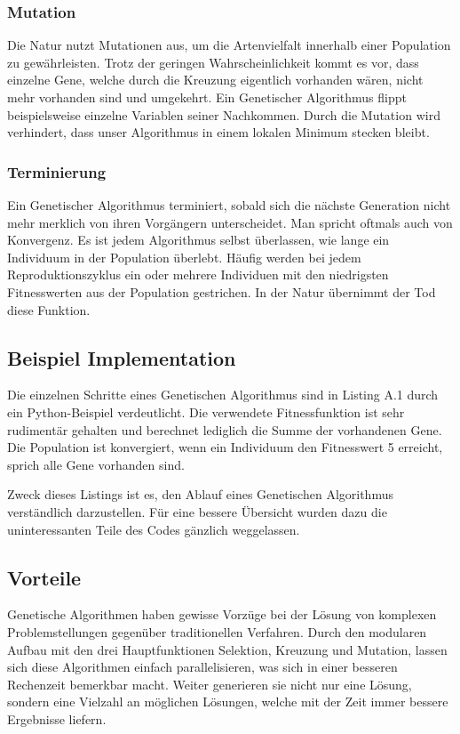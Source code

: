 \subsubsection{Mutation}
Die Natur nutzt Mutationen aus, um die Artenvielfalt innerhalb einer Population zu gewährleisten.
Trotz der geringen Wahrscheinlichkeit kommt es vor, dass einzelne Gene, welche durch die Kreuzung
eigentlich vorhanden wären, nicht mehr vorhanden sind und umgekehrt. Ein Genetischer Algorithmus
flippt beispielsweise einzelne Variablen seiner Nachkommen. Durch die Mutation wird verhindert,
dass unser Algorithmus in einem lokalen Minimum stecken bleibt.

\subsubsection{Terminierung}
Ein Genetischer Algorithmus terminiert, sobald sich die nächste Generation nicht mehr merklich von
ihren Vorgängern unterscheidet. Man spricht oftmals auch von Konvergenz. Es ist jedem Algorithmus
selbst überlassen, wie lange ein Individuum in der Population überlebt. Häufig werden bei jedem
Reproduktionszyklus ein oder mehrere Individuen mit den niedrigsten Fitnesswerten aus der Population
gestrichen. In der Natur übernimmt der Tod diese Funktion.

\subsection{Beispiel Implementation}
Die einzelnen Schritte eines Genetischen Algorithmus sind in Listing A.1 durch
ein Python-Beispiel verdeutlicht. Die verwendete Fitnessfunktion ist sehr rudimentär
gehalten und berechnet lediglich die Summe der vorhandenen Gene. Die Population ist konvergiert,
wenn ein Individuum den Fitnesswert 5 erreicht, sprich alle Gene vorhanden sind.

Zweck dieses Listings ist es, den Ablauf eines Genetischen Algorithmus verständlich darzustellen.
Für eine bessere Übersicht wurden dazu die uninteressanten Teile des Codes gänzlich weggelassen.

\subsection{Vorteile}
Genetische Algorithmen haben gewisse Vorzüge bei der Lösung von komplexen
Problemstellungen gegenüber traditionellen Verfahren. Durch den modularen Aufbau
mit den drei Hauptfunktionen Selektion, Kreuzung und Mutation, lassen sich diese
Algorithmen einfach parallelisieren, was sich in einer besseren Rechenzeit bemerkbar
macht. Weiter generieren sie nicht nur eine Lösung, sondern eine Vielzahl an möglichen
Lösungen, welche mit der Zeit immer bessere Ergebnisse liefern. \cite{Gou19}

